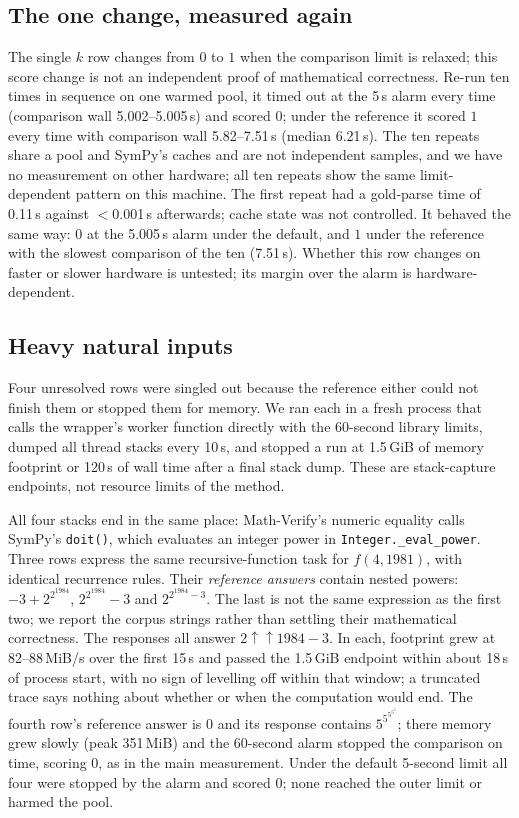 \documentclass[10pt,a4paper]{article}
\newcommand{\mv}{Math-Verify}
\begin{document}
\subsection{The one change, measured again}

The single $k$ row changes from $0$ to $1$ when the comparison limit is
relaxed; this score change is not an independent proof of mathematical
correctness. Re-run ten times in sequence on one
warmed pool, it timed out at the 5\,s alarm every time (comparison wall
5.002--5.005\,s) and scored $0$; under the reference it scored $1$ every time
with comparison wall 5.82--7.51\,s (median 6.21\,s). The ten repeats share a
pool and SymPy's caches and are not independent samples, and we have no
measurement on other hardware; all ten repeats show the same limit-dependent
pattern on this machine. The first repeat had a gold-parse time of 0.11\,s
against $<$0.001\,s afterwards; cache state was not controlled. It behaved
the same way: $0$ at the 5.005\,s alarm
under the default, and $1$ under the reference with the slowest comparison of
the ten (7.51\,s). Whether this row changes on faster or slower hardware is
untested; its margin over the alarm is hardware-dependent.

\subsection{Heavy natural inputs}
\label{sec:prevalence-heavy}

Four unresolved rows were singled out because the reference either could not
finish them or stopped them for memory. We ran each in a fresh process that
calls the wrapper's worker function directly with the 60-second library
limits, dumped all thread stacks every 10\,s, and stopped a run at 1.5\,GiB of
memory footprint or 120\,s of wall time after a final stack dump. These are
stack-capture endpoints, not resource limits of the method.

All four stacks end in the same place: \mv{}'s numeric equality calls SymPy's
\texttt{doit()}, which evaluates an integer power in
\texttt{Integer.\_eval\_power}. Three rows express the same recursive-function
task for $f(4,1981)$, with identical recurrence rules. Their \emph{reference answers} contain nested
powers: $-3+2^{2^{1984}}$, $2^{2^{1984}}-3$ and $2^{2^{1984}-3}$.
The last is not the same expression as the first two; we report the corpus
strings rather than settling their mathematical correctness. The responses
all answer $2\uparrow\uparrow 1984-3$. In each, footprint grew at 82--88\,MiB/s over the
first 15\,s and passed the 1.5\,GiB endpoint within about 18\,s of process
start, with no sign of levelling off within that window; a truncated
trace says nothing about whether or when the computation would end. The fourth row's reference answer is $0$ and its response
contains $5^{5^{5^{5^{5}}}}$; there memory grew slowly (peak 351\,MiB) and the
60-second alarm stopped the comparison on time, scoring $0$, as in the main
measurement. Under the default 5-second limit all four were stopped by the
alarm and scored $0$; none reached the outer limit or harmed the pool.
\end{document}
